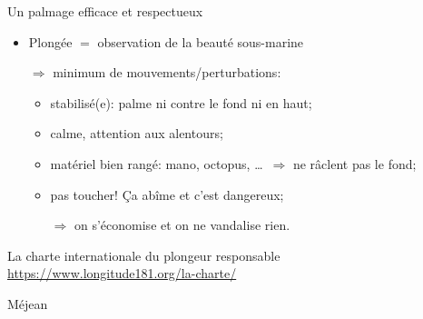 \begin{frame}{Un palmage efficace et respectueux}
\begin{alertblock}{}
\end{alertblock}

\begin{itemize}[<+(1)->]
\item Plongée  $=$ observation de la beauté sous-marine
\item[$\Rightarrow$] minimum de mouvements/perturbations:
  \begin{itemize}[<+->]
    \item stabilisé(e): palme ni contre le fond ni en haut;
    \item calme, attention aux alentours;
    \item matériel bien rangé: mano, octopus, \dots\ $\Rightarrow$ ne râclent pas le fond;
    \item pas toucher! Ça abîme et c'est dangereux;
    \item[$\Rightarrow$] on s'économise et on ne vandalise rien.
  \end{itemize}
\end{itemize}
\end{frame}

\begin{frame}{La charte internationale du plongeur responsable}
{\url{https://www.longitude181.org/la-charte/}}
\centering{}
\end{frame}


\begin{frame}{Méjean}
\centering%
\end{frame}
